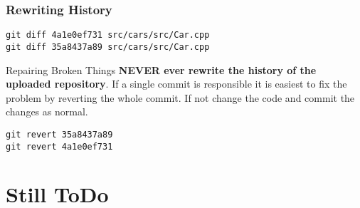 \documentclass{beamer}
\begin{document}
\begin{frame}[fragile]
  \frametitle{Rewriting History}
  \begin{lstlisting}[title=Verify changes, style=cmd]
git diff 4a1e0ef731 src/cars/src/Car.cpp
git diff 35a8437a89 src/cars/src/Car.cpp
  \end{lstlisting}

  \pause

  \begin{block}{Repairing Broken Things}
    {\bf NEVER ever rewrite the history of the uploaded repository}. If a single commit is responsible it is easiest to fix the problem by reverting the whole commit. If not change the code and commit the changes as normal.
  \end{block}

  \pause

  \begin{lstlisting}[title=Repair Everything, style=cmd]
git revert 35a8437a89
git revert 4a1e0ef731
  \end{lstlisting}
\end{frame}

\section{Still ToDo}

\end{document}
